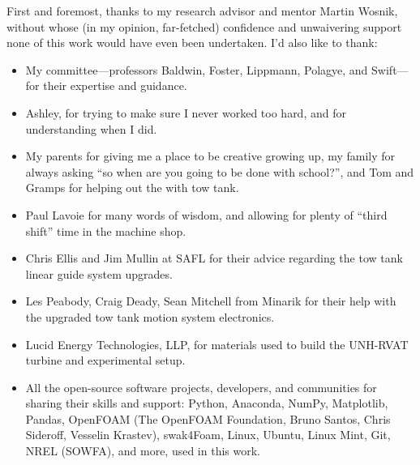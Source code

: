 



\begin{Acknowledgments}
\setlength{\baselineskip}{1.5\baselineskip}
{

    First and foremost, thanks to my research advisor and mentor Martin Wosnik,
    without whose (in my opinion, far-fetched) confidence and unwaivering
    support none of this work would have even been undertaken. I'd also like to
    thank:

    \begin{itemize}

        \item My committee---professors Baldwin, Foster, Lippmann, Polagye, and
        Swift---for their expertise and guidance.

        \item Ashley, for trying to make sure I never worked too hard, and for
        understanding when I did.

        \item My parents for giving me a place to be creative growing up, my
        family for always asking ``so when are you going to be done with
        school?'', and Tom and Gramps for helping out the with tow tank.

        \item Paul Lavoie for many words of wisdom, and allowing for plenty of
        ``third shift'' time in the machine shop.

        \item Chris Ellis and Jim Mullin at SAFL for their advice regarding the
        tow tank linear guide system upgrades.

        \item Les Peabody, Craig Deady, Sean Mitchell from Minarik for their
        help with the upgraded tow tank motion system electronics.

        \item Lucid Energy Technologies, LLP, for materials used to build the
        UNH-RVAT turbine and experimental setup.

        \item All the open-source software projects, developers, and communities
        for sharing their skills and support: Python, Anaconda, NumPy,
        Matplotlib, Pandas, OpenFOAM (The OpenFOAM Foundation, Bruno Santos,
        Chris Sideroff, Vesselin Krastev), swak4Foam, Linux, Ubuntu, Linux Mint,
        Git, NREL (SOWFA), and more, used in this work.


\end{itemize}}
\end{Acknowledgments}
